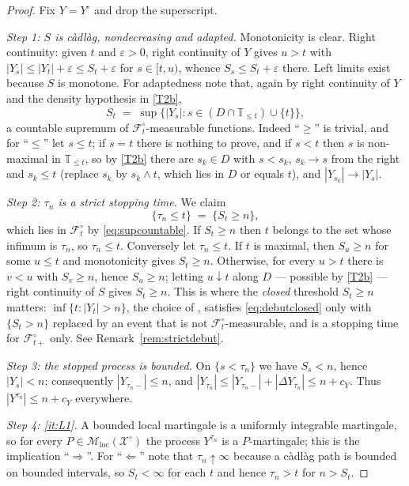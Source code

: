 \documentclass[11pt,a4paper]{article}
\theoremstyle{plain}
\theoremstyle{definition}
\theoremstyle{remark}
\newcommand{\T}{\mathbb{T}}                     %
\newcommand{\Filt}{\mathcal{F}}
\newcommand{\XX}{\mathcal{X}}                  %
\newcommand{\Msol}{\mathcal{M}}
\newcommand{\JS}{\cite{JS03}}
\begin{document}
\begin{proof}
  Fix $Y = Y^\circ$ and drop the superscript.

  \emph{Step 1: $S$ is c\`adl\`ag, nondecreasing and adapted.}  Monotonicity is
  clear.  Right continuity: given $t$ and $\varepsilon > 0$, right continuity of $Y$
  gives $u > t$ with $|Y_s| \leq |Y_t| + \varepsilon \leq S_t + \varepsilon$ for
  $s \in [t,u)$, whence $S_s \leq S_t + \varepsilon$ there.  Left limits exist because
  $S$ is monotone.  For adaptedness note that, again by right continuity of $Y$
  and the density hypothesis in \eqref{T2b},
  \begin{equation}
    \label{eq:supcountable}
    S_t \;=\; \sup\bigl\{ |Y_s| : s \in (D \cap \T_{\leq t}) \cup \{t\} \bigr\} ,
  \end{equation}
  a countable supremum of $\Filt^\circ_t$-measurable functions.  Indeed
  ``$\geq$'' is trivial, and for ``$\leq$'' let $s \leq t$; if $s = t$ there is
  nothing to prove, and if $s < t$ then $s$ is non-maximal in $\T_{\leq t}$, so
  by \eqref{T2b} there are $s_k \in D$ with $s < s_k$, $s_k \to s$ from the right and
  $s_k \leq t$ (replace $s_k$ by $s_k \wedge t$, which lies in $D$ or equals
  $t$), and $|Y_{s_k}| \to |Y_s|$.

  \emph{Step 2: $\tau_n$ is a strict stopping time.}  We claim
  \begin{equation}
    \label{eq:debutclosed}
    \{ \tau_n \leq t \} \;=\; \{ S_t \geq n \} ,
  \end{equation}
  which lies in $\Filt^\circ_t$ by \eqref{eq:supcountable}.  If $S_t \geq n$ then
  $t$ belongs to the set whose infimum is $\tau_n$, so $\tau_n \leq t$.
  Conversely let $\tau_n \leq t$.  If $t$ is maximal, then $S_u \geq n$ for some
  $u \leq t$ and monotonicity gives $S_t \geq n$.  Otherwise, for every $u > t$
  there is $v < u$ with $S_v \geq n$, hence $S_u \geq n$; letting $u \downarrow t$
  along $D$ --- possible by \eqref{T2b} --- right continuity of $S$ gives $S_t \geq n$.
  This is where the \emph{closed} threshold $S_t \geq n$ matters:
  $\inf\{t : |Y_t| > n\}$, the choice of \JS, satisfies \eqref{eq:debutclosed}
  only with $\{ S_t > n \}$ replaced by an event that is not
  $\Filt^\circ_t$-measurable, and is a stopping time for $\Filt^\circ_{t+}$
  only.  See Remark~\ref{rem:strictdebut}.

  \emph{Step 3: the stopped process is bounded.}  On $\{s < \tau_n\}$ we have
  $S_s < n$, hence $|Y_s| < n$; consequently $|Y_{\tau_n-}| \leq n$, and
  $|Y_{\tau_n}| \leq |Y_{\tau_n-}| + |\Delta Y_{\tau_n}| \leq n + c_Y$.  Thus
  $|Y^{\tau_n}| \leq n + c_Y$ everywhere.

  \emph{Step 4: \ref{it:L1}.}  A bounded local martingale is a uniformly
  integrable martingale, so for every $P \in \Msol_{\mathrm{loc}}(\XX^\circ)$ the
  process $Y^{\tau_n}$ is a $P$-martingale; this is the implication
  ``$\Rightarrow$''.  For ``$\Leftarrow$'' note that $\tau_n \uparrow \infty$
  because a c\`adl\`ag path is bounded on bounded intervals, so $S_t < \infty$
  for each $t$ and hence $\tau_n > t$ for $n > S_t$.
\end{proof}
\end{document}
